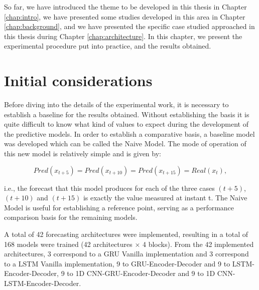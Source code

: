 \cleardoublepage
\label{chap:results}

So far, we have introduced the theme to be developed in this thesis in Chapter \ref{chap:intro}, we have presented some studies developed in this area in Chapter \ref{chap:background}, and we have presented the specific case studied approached in this thesis during Chapter \ref{chap:architecture}. In this chapter, we present the experimental procedure put into practice, and the results obtained.



\section{Initial considerations}

Before diving into the details of the experimental work, it is necessary to establish a baseline for the results obtained. Without establishing the basis it is quite difficult to know what kind of values to expect during the development of the predictive models. In order to establish a comparative basis, a baseline model was developed which can be called the Naive Model. The mode of operation of this new model is relatively simple and is given by:

\begin{equation}
   Pred(x_{t+5}) = Pred(x_{t+10}) = Pred(x_{t+15}) = Real(x_{t}),
   \label{naive}
\end{equation}

i.e., the forecast that this model produces for each of the three cases $(t+5)$, $(t+10)$ and $(t+15)$ is exactly the value measured at instant t. The Naive Model is useful for establishing a reference point, serving as a performance comparison basis for the remaining models.

A total of 42 forecasting architectures were implemented, resulting in a total of 168 models were trained (42 architectures $\times$ 4 blocks). From the 42 implemented architectures, 3 correspond to a \ac{GRU} Vanilla implementation and 3 correspond to a \ac{LSTM} Vanilla implementation, 9 to \ac{GRU}-Encoder-Decoder and 9 to \ac{LSTM}-Encoder-Decoder, 9 to \ac{1D CNN}-\ac{GRU}-Encoder-Decoder and 9 to \ac{1D CNN}-\ac{LSTM}-Encoder-Decoder.

